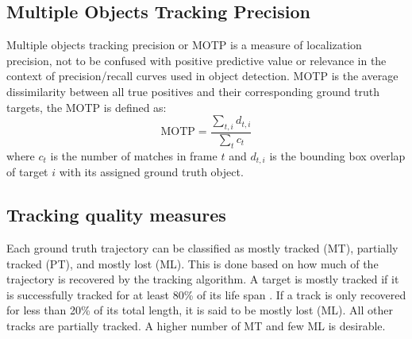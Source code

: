\subsection{Multiple Objects Tracking Precision}
Multiple objects tracking precision or MOTP is a measure of localization precision, not to be confused with positive predictive value or relevance in the context of precision/recall curves used in object detection\cite{Milan2016MOT16AB}. MOTP is the average dissimilarity between all true positives and their corresponding ground truth targets, the MOTP is defined as:
\begin{equation}
    \text{MOTP} = \frac{\sum_{t,i}d_{t,i}}{\sum_t c_t}
\end{equation}
where $c_t$ is the number of matches in frame $t$ and $d_{t,i}$ is the bounding box overlap of target $i$ with its assigned ground truth object.
\subsection{Tracking quality measures}
Each ground truth trajectory can be classified as mostly tracked (MT), partially tracked (PT), and mostly lost
(ML). This is done based on how much of the trajectory is recovered by the tracking algorithm. A target is mostly
tracked if it is successfully tracked for at least 80\% of its life span \cite{Milan2016MOT16AB}. If a track is only recovered for less than 20\% of its total length, it is said to be mostly lost (ML). All other
tracks are partially tracked. A higher number of MT and few ML is desirable.

